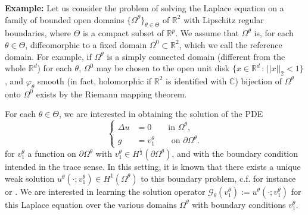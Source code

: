 \documentclass[review]{elsarticle}
\def\Omegatheta{{\Omega^\theta}}
\def\refd{0}
\def\Omegaref{{\Omega^\refd}}
\begin{document}
\begin{mdframed} 
\textbf{Example:} Let us consider the problem of solving the Laplace equation on a family of bounded open domains $\{\Omegatheta\}_{\theta \in \Theta}$ of $\mathbb{R}^{2}$ with Lipschitz regular boundaries, where $\Theta$ is a compact subset of $\mathbb{R}^p$. 
We assume that $\Omegatheta$ is, for each $\theta\in\Theta$, diffeomorphic to a fixed domain $\Omegaref\subset \mathbb{R}^2$, which we call the reference domain. For example, if $\Omegatheta$ is a simply connected domain (different from the whole $\mathbb{R}^d$) for each $\theta$, $\Omegaref$ may be chosen to the open unit disk $\{x\in\mathbb{R}^d\,:\,||x||_2<1\}$, and $\varphi_\theta$ smooth (in fact, holomorphic if $\mathbb{R}^2$ is identified with $\mathbb{C}$) bijection of $\Omegatheta$ onto $\Omegaref$ exists by the Riemann mapping theorem.

For each $\theta\in\Theta$, we are interested in obtaining the solution of the PDE
\begin{equation}
\label{eq:Laplace_PDE}
\begin{cases}
    \Delta u &= 0 \qquad \text{in }\Omegatheta, \\
    g&=v_1^\theta \qquad \text{on }\partial\Omegatheta.
\end{cases}
\end{equation}
for $v_1^\theta$ a function on $\partial \Omegatheta$ with $v_1^\theta \in H^{\frac{1}{2}}(\partial \Omegatheta)$, and with the boundary condition intended in the trace sense. In this setting, it is known that there exists a unique weak solution $u^{\theta}(\cdot;v_1^\theta) \in H^1(\Omegatheta)$ to this boundary problem, c.f. for instance \cite{gilbarg1977elliptic} or \cite{jerison1995inhomogeneous}. We are interested in learning the solution operator $\mathcal{G}_\theta(v_1^\theta):=u^{\theta}(\cdot;v_1^\theta)$ for this Laplace equation over the various domains $\Omegatheta$ with boundary conditions $v_1^\theta$.
\end{mdframed}
\end{document}
